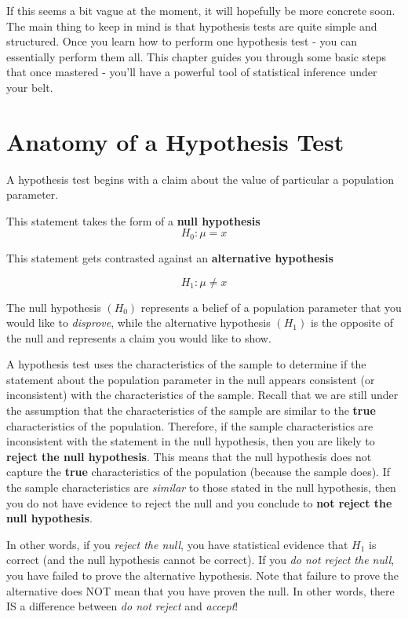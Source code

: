 \documentclass[
]{book}
\begin{document}
If this seems a bit vague at the moment, it will hopefully be more concrete soon. The main thing to keep in mind is that hypothesis tests are quite simple and structured. Once you learn how to perform one hypothesis test - you can essentially perform them all. This chapter guides you through some basic steps that once mastered - you'll have a powerful tool of statistical inference under your belt.

\hypertarget{anatomy-of-a-hypothesis-test}{%
\section{Anatomy of a Hypothesis Test}\label{anatomy-of-a-hypothesis-test}}

A hypothesis test begins with a claim about the value of particular a population parameter.

This statement takes the form of a \textbf{null hypothesis}
\[H_0 : \mu = x\]

This statement gets contrasted against an \textbf{alternative hypothesis}

\[H_1 : \mu \neq x\]

The null hypothesis \((H_0)\) represents a belief of a population parameter that you would like to \emph{disprove}, while the alternative hypothesis \((H_1)\) is the opposite of the null and represents a claim you would like to show.

A hypothesis test uses the characteristics of the sample to determine if the statement about the population parameter in the null appears consistent (or inconsistent) with the characteristics of the sample. Recall that we are still under the assumption that the characteristics of the sample are similar to the \textbf{true} characteristics of the population. Therefore, if the sample characteristics are inconsistent with the statement in the null hypothesis, then you are likely to \textbf{reject the null hypothesis}. This means that the null hypothesis does not capture the \textbf{true} characteristics of the population (because the sample does). If the sample characteristics are \emph{similar} to those stated in the null hypothesis, then you do not have evidence to reject the null and you conclude to \textbf{not reject the null hypothesis}.

In other words, if you \emph{reject the null}, you have statistical evidence that \(H_1\) is correct (and the null hypothesis cannot be correct). If you \emph{do not reject the null}, you have failed to prove the alternative hypothesis. Note that failure to prove the alternative does NOT mean that you have proven the null. In other words, there IS a difference between \emph{do not reject} and \emph{accept}!
\end{document}
